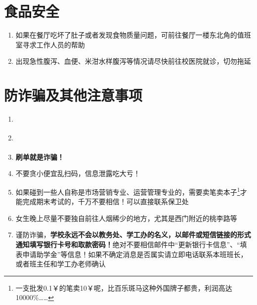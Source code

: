 \section[食品安全]{食品安全}
\begin{enumerate}
    \item 如果在餐厅吃坏了肚子或者发现食物质量问题，可前往餐厅一楼东北角的值班室寻求工作人员的帮助
    \item 出现急性腹泻、血便、米泔水样腹泻等情况请尽快前往校医院就诊，切勿拖延
\end{enumerate}

\section[防诈骗及其他注意事项]{防诈骗及其他注意事项}
\begin{enumerate}
    \item \textbf{}
    \item \textbf{}
    \item \textbf{刷单就是诈骗！}
    \item 不要贪小便宜乱扫码，信息泄露吃大亏！
    \item 如果碰到一些人自称是市场营销专业、运营管理专业的，需要卖笔卖本子\footnote{一支批发0.1￥的笔卖10￥呢，比百乐斑马这种外国牌子都贵，利润高达10000\%……}才能完成期末考试的，千万不要相信！可以直接联系保卫处
    \item 女生晚上尽量不要独自前往人烟稀少的地方，尤其是西门附近的桃李路等
    \item 谨防诈骗，\textbf{学校永远不会以教务处、学工办的名义，以邮件或短信链接的形式通知填写银行卡号和取款密码！}绝对不要相信邮件中“更新银行卡信息”、“填表申请助学金”等信息！如果不确定消息是否属实请立即电话联系本班班长，或者班主任和学工办老师确认
\end{enumerate}
